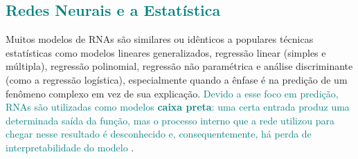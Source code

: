 \documentclass{automatextcc}
\newcommand{\nico}[1]{\textcolor{teal}{#1}}
\begin{document}
\subsection{\nico{Redes Neurais e a Estatística}}
Muitos modelos de RNAs são similares ou idênticos a populares técnicas estatísticas como modelos lineares generalizados, regressão linear (simples e múltipla), regressão polinomial, regressão não paramétrica e análise discriminante (como a regressão logística), especialmente quando a ênfase é na predição de um fenômeno complexo em vez de sua explicação. \nico{Devido a esse foco em predição, RNAs são utilizadas como modelos \textbf{caixa preta}: uma certa entrada produz uma determinada saída da função, mas o processo interno que a rede utilizou para chegar nesse resultado é desconhecido e, consequentemente, há perda de interpretabilidade do modelo \citep{sarle1994, cheng1994, rojas1996}}.
\end{document}
